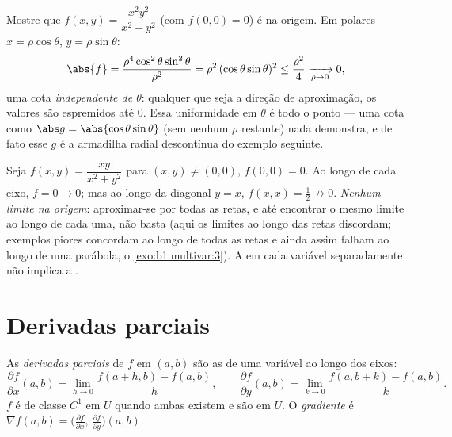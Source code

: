 \begin{example}
\label{ex:b1:multivar:polarbound}
Mostre que $f(x, y) = \dfrac{x^2y^2}{x^2 + y^2}$ (com $f(0,0) =
0$) é  na origem. Em 
polares $x =
\rho\cos\theta$, $y = \rho\sin\theta$:
\[
\abs{f} = \frac{\rho^4\cos^2\theta\sin^2\theta}{\rho^2}
= \rho^2\,(\cos\theta\sin\theta)^2 \leq \frac{\rho^2}{4}
\xrightarrow[\rho \to 0]{} 0 ,
\]
uma cota \emph{independente de $\theta$}: qualquer que seja a direção
de aproximação, os valores são espremidos até $0$. Essa uniformidade
em $\theta$ é todo o ponto --- uma cota como $\abs g =
\abs{\cos\theta\sin\theta}$ (sem nenhum $\rho$
restante) nada demonstra, e de fato esse $g$ é a armadilha radial
descontínua do exemplo seguinte.
\end{example}

\begin{example}\label{ex:b1:multivar:trap}
Seja $f(x, y) = \dfrac{xy}{x^2 + y^2}$ para $(x,y) \neq (0,0)$, $f(0,
0) = 0$. Ao longo de cada eixo, $f = 0 \to 0$; mas ao
longo da diagonal $y = x$, $f(x, x) = \frac12 \not\to 0$. \emph{Nenhum limite na origem}:
aproximar-se por todas as retas, e até encontrar o mesmo limite ao
longo de cada uma, não basta (aqui os limites ao longo das retas
discordam; exemplos piores concordam ao longo de todas as retas e
ainda assim falham ao longo de uma parábola, o \cref{exo:b1:multivar:3}). A 
em cada variável separadamente não implica a .
\end{example}

\section{Derivadas parciais}

\begin{definition}\label{def:b1:multivar:partial}
As \emph{derivadas parciais} de $f$ em
$(a, b)$ são as  de uma variável ao longo dos eixos:
\[
\frac{\partial f}{\partial x}(a,b)
= \lim_{h \to 0} \frac{f(a + h, b) - f(a,b)}{h},
\qquad
\frac{\partial f}{\partial y}(a,b)
= \lim_{k \to 0} \frac{f(a, b + k) - f(a,b)}{k}.
\]
$f$ é de classe $C^1$ em $U$ quando ambas existem e são  em
$U$. O \emph{gradiente} é $\nabla f(a,b) =
\bigl(\frac{\partial f}{\partial x},\, \frac{\partial f}{\partial
y}\bigr)(a,b)$.
\end{definition}

